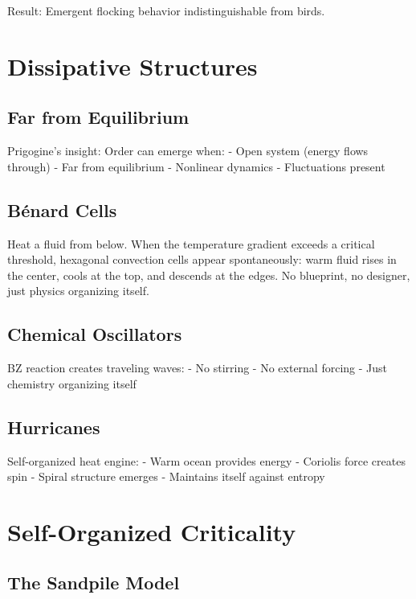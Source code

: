 \documentclass[
  11pt,
  letterpaper,
  twoside,
  openright]{book}
\begin{document}
Result: Emergent flocking behavior indistinguishable from birds.

\section{Dissipative Structures}\label{dissipative-structures}

\subsection{Far from Equilibrium}\label{far-from-equilibrium}

Prigogine's insight: Order can emerge when: - Open system (energy flows
through) - Far from equilibrium - Nonlinear dynamics - Fluctuations
present

\subsection{Bénard Cells}\label{buxe9nard-cells}

Heat a fluid from below. When the temperature gradient exceeds a
critical threshold, hexagonal convection cells appear spontaneously:
warm fluid rises in the center, cools at the top, and descends at the
edges. No blueprint, no designer, just physics organizing itself.

\subsection{Chemical Oscillators}\label{chemical-oscillators}

BZ reaction creates traveling waves: - No stirring - No external forcing
- Just chemistry organizing itself

\subsection{Hurricanes}\label{hurricanes}

Self-organized heat engine: - Warm ocean provides energy - Coriolis
force creates spin - Spiral structure emerges - Maintains itself against
entropy

\section{Self-Organized Criticality}\label{self-organized-criticality}

\subsection{The Sandpile Model}\label{the-sandpile-model}
\end{document}
